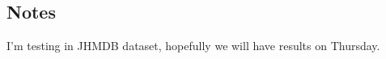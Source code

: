 \subsection{Notes}
I'm testing in JHMDB dataset, hopefully we will have results on Thursday.

%
\begin{comment}
\subsection{Recognition of composable activities}
\label{subsec:experiments_summary}
%

\subsection{Impact of including motion features}
\label{subsec:exp_motionfeats}

\subsection{Impact of latent spatial assignment of actions}
\label{subsec:exp_vlatent}
%

\subsection{Impact of using multiple classifiers per semantic action}
\label{subsec:exp_multiple}
%

\subsection{Impact of handling non-informative poses}
\label{subsec:exp_non_info_handling}
%
\end{comment}



%
%

